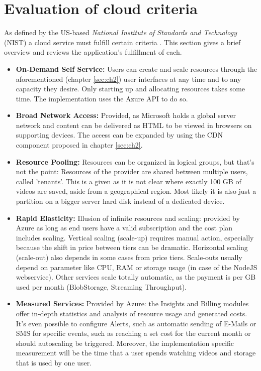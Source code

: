 \section{Evaluation of cloud criteria}\label{sec:ch4}
As defined by the US-based \textit{National Institute of Standards and Technology}
(NIST) a cloud service must fulfill certain criteria \cite{nistCloud}. This 
section gives a brief overview and reviews the application's fulfillment of each.
\begin{itemize}
    \item \textbf{On-Demand Self Service:} Users can create and scale resources 
    through the aforementioned (chapter \ref{sec:ch2}) user interfaces at any time
    and to any capacity they desire. Only starting up and allocating resources 
    takes some time. The implementation uses the Azure API to do so.
    \item \textbf{Broad Network Access:} Provided, as Microsoft holds a global 
    server network and content can be delivered as HTML to be viewed in browsers 
    on supporting devices. The access can be expanded by using the CDN component 
    proposed in chapter \ref{sec:ch2}.
    \item \textbf{Resource Pooling:} Resources can be organized in logical groups,
    but that's not the point: Resources of the provider are shared between 
    multiple users, called 'tenants'. This is a given as it is not clear where exactly
    100 GB of videos are saved, aside from a geographical region. Most likely it is also
    just a partition on a bigger server hard disk instead of a dedicated device.
    \item \textbf{Rapid Elasticity:} Illusion of infinite resources and scaling: 
    provided by Azure as long as end users have a valid subscription and the cost 
    plan includes scaling. Vertical scaling (scale-up) requires manual action, 
    especially because the shift in price between tiers can be dramatic. 
    Horizontal scaling (scale-out) also depends in some cases from price tiers. 
    Scale-outs usually depend on parameter like CPU, RAM or storage usage (in case of the NodeJS 
    webservice). Other services scale totally automatic, as the payment is per GB used per month
    (BlobStorage, Streaming Throughput).
    \item \textbf{Measured Services:} Provided by Azure: the Insights and Billing modules
    offer in-depth statistics and analysis of resource usage and generated costs. It's even
    possible to configure Alerts, such as automatic sending of E-Mails or SMS for specific events,
    such as reaching a set cost for the current month or should autoscaling be triggered. Moreover, the implementation specific measurement will be the time that a 
    user spends watching videos and storage that is used by one user.
\end{itemize}
